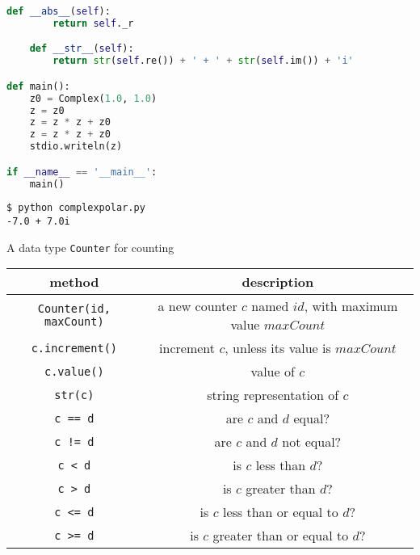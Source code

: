 \documentclass[8pt,a4paper,compress,handout]{beamer}
\begin{document}
\begin{frame}[fragile]
\begin{lstlisting}[language=Python]
    def __abs__(self):
        return self._r

    def __str__(self):
        return str(self.re()) + ' + ' + str(self.im()) + 'i'

def main():
    z0 = Complex(1.0, 1.0)
    z = z0
    z = z * z + z0
    z = z * z + z0
    stdio.writeln(z)

if __name__ == '__main__':
    main()
\end{lstlisting}

\begin{lstlisting}[language={}]
$ python complexpolar.py 
-7.0 + 7.0i
\end{lstlisting}
\end{frame}

\begin{frame}[fragile]
A data type \lstinline{Counter} for counting
\begin{center}
\begin{tabular}{cc}
method & description \\ \hline
\lstinline$Counter(id, maxCount)$ & a new counter $c$ named $id$, with maximum value $maxCount$ \\
\lstinline$c.increment()$ & increment $c$, unless its value is $maxCount$ \\
\lstinline$c.value()$ & value of $c$ \\
\lstinline$str(c)$ & string representation of $c$ \\
\lstinline$c == d$ & are $c$ and $d$ equal? \\
\lstinline$c != d$ & are $c$ and $d$ not equal? \\
\lstinline$c < d$ & is $c$ less than $d$? \\
\lstinline$c > d$ & is $c$ greater than $d$? \\
\lstinline$c <= d$ & is $c$ less than or equal to $d$? \\
\lstinline$c >= d$ & is $c$ greater than or equal to $d$? \\
\end{tabular} 
\end{center}
\end{frame}
\end{document}
